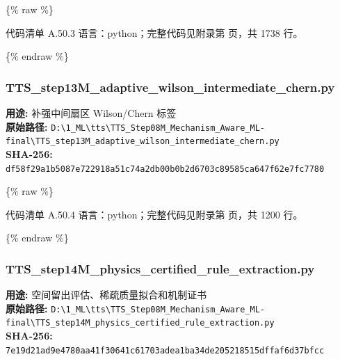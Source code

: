 \documentclass[lang=cn,scheme=chinese,color=blue,device=normal,toc=onecol,math=cm]{elegantbook}
\begin{document}
\{\% raw \%\}\par


\begin{codeindexbox}{代码清单 A.50.3}
语言：python；完整代码见附录第 \pageref{code:50:3} 页，共 1738 行。
\end{codeindexbox}


\{\% endraw \%\}\par


\subsubsection{TTS\_\allowbreak{}step13M\_\allowbreak{}adaptive\_\allowbreak{}wilson\_\allowbreak{}intermediate\_\allowbreak{}chern.py}


\textbf{用途:} 补强中间扇区 Wilson/\allowbreak{}Chern 标签\\ \textbf{原始路径:} \texttt{D:\textbackslash{}\allowbreak{}1\_\allowbreak{}ML\textbackslash{}\allowbreak{}tts\textbackslash{}\allowbreak{}TTS\_\allowbreak{}Step08M\_\allowbreak{}Mechanism\_\allowbreak{}Aware\_\allowbreak{}ML-final\textbackslash{}\allowbreak{}TTS\_\allowbreak{}step13M\_\allowbreak{}adaptive\_\allowbreak{}wilson\_\allowbreak{}intermediate\_\allowbreak{}chern.py}\\ \textbf{SHA-256:} \texttt{df58f29a1b5087e722918a51c74a2db00b0b2d6703c89585ca647f62e7fc7780}\par


\{\% raw \%\}\par


\begin{codeindexbox}{代码清单 A.50.4}
语言：python；完整代码见附录第 \pageref{code:50:4} 页，共 1200 行。
\end{codeindexbox}


\{\% endraw \%\}\par


\subsubsection{TTS\_\allowbreak{}step14M\_\allowbreak{}physics\_\allowbreak{}certified\_\allowbreak{}rule\_\allowbreak{}extraction.py}


\textbf{用途:} 空间留出评估、稀疏质量拟合和机制证书\\ \textbf{原始路径:} \texttt{D:\textbackslash{}\allowbreak{}1\_\allowbreak{}ML\textbackslash{}\allowbreak{}tts\textbackslash{}\allowbreak{}TTS\_\allowbreak{}Step08M\_\allowbreak{}Mechanism\_\allowbreak{}Aware\_\allowbreak{}ML-final\textbackslash{}\allowbreak{}TTS\_\allowbreak{}step14M\_\allowbreak{}physics\_\allowbreak{}certified\_\allowbreak{}rule\_\allowbreak{}extraction.py}\\ \textbf{SHA-256:} \texttt{7e19d21ad9e4780aa41f30641c61703adea1ba34de205218515dffaf6d37bfcc}\par
\end{document}
